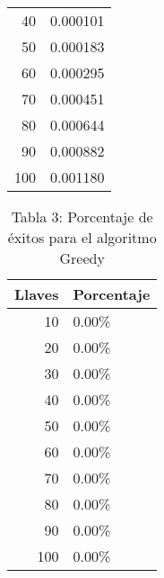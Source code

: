\documentclass[a4paper]{article}
\begin{document}
\begin{center}
\begin{table}[ht]
\begin{tabular}{r|l}
40&0.000101\\
50&0.000183\\
60&0.000295\\
70&0.000451\\
80&0.000644\\
90&0.000882\\
100&0.001180\\
\end{tabular}
\end{table}
\begin{table}[ht]
\centering
\caption*{Tabla 3: Porcentaje de \'exitos para el algoritmo Greedy}
\label{4}
\begin{tabular}{r|l}
Llaves & Porcentaje \\ \hline
10&0.00\%\\
20&0.00\%\\
30&0.00\%\\
40&0.00\%\\
50&0.00\%\\
60&0.00\%\\
70&0.00\%\\
80&0.00\%\\
90&0.00\%\\
100&0.00\%\\
\end{tabular}
\end{table}
\end{center}
\end{document}
